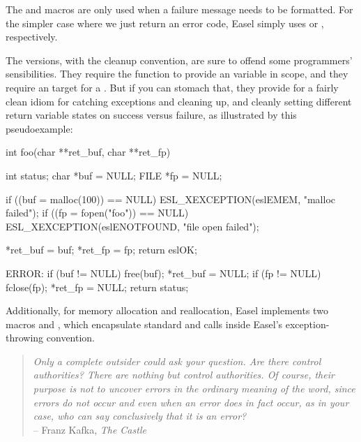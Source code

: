 

The  and  macros are only used when
a failure message needs to be formatted. For the simpler case where we
just return an error code, Easel simply uses  or
, respectively.

The  versions, with the cleanup convention, are sure to
offend some programmers' sensibilities. They require the function to
provide an  variable in scope, and they require an
 target for a . But if you can stomach that,
they provide for a fairly clean idiom for catching exceptions and
cleaning up, and cleanly setting different return variable states on
success versus failure, as illustrated by this pseudoexample:

\begin{cchunk}
int 
foo(char **ret_buf, char **ret_fp)
{
    int status;
    char *buf = NULL;
    FILE *fp  = NULL;

    if ((buf = malloc(100))  == NULL) ESL_XEXCEPTION(eslEMEM,      "malloc failed");
    if ((fp  = fopen("foo")) == NULL) ESL_XEXCEPTION(eslENOTFOUND, "file open failed");

    *ret_buf = buf;
    *ret_fp  = fp;
    return eslOK;

  ERROR:
    if (buf != NULL) free(buf);  *ret_buf = NULL;
    if (fp  != NULL) fclose(fp); *ret_fp  = NULL;
    return status;
}
\end{cchunk}

Additionally, for memory allocation and reallocation, Easel implements
two macros  and , which
encapsulate standard  and  calls
inside Easel's exception-throwing convention.


\vspace*{\fill}
\begin{quote}
\emph{Only a complete outsider could ask your question. Are there
control authorities? There are nothing but control authorities. Of
course, their purpose is not to uncover errors in the ordinary meaning
of the word, since errors do not occur and even when an error does in
fact occur, as in your case, who can say conclusively that it is an
error?}\\ \hspace*{\fill} -- Franz Kafka, \emph{The Castle}
\end{quote}     


